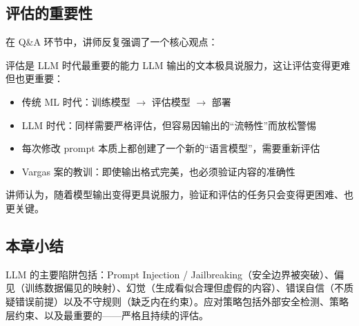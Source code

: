 \subsection{评估的重要性}

在 Q\&A 环节中，讲师反复强调了一个核心观点：

\begin{importantbox}{评估是 LLM 时代最重要的能力}
LLM 输出的文本极具说服力，这让评估变得更难但也更重要：
\begin{itemize}
    \item 传统 ML 时代：训练模型 $\rightarrow$ 评估模型 $\rightarrow$ 部署
    \item LLM 时代：同样需要严格评估，但容易因输出的``流畅性''而放松警惕
    \item 每次修改 prompt 本质上都创建了一个新的``语言模型''，需要重新评估
    \item Vargas 案的教训：即使输出格式完美，也必须验证内容的准确性
\end{itemize}
讲师认为，随着模型输出变得更具说服力，验证和评估的任务只会变得更困难、也更关键。
\end{importantbox}

\subsection{本章小结}

LLM 的主要陷阱包括：Prompt Injection / Jailbreaking（安全边界被突破）、偏见（训练数据偏见的映射）、幻觉（生成看似合理但虚假的内容）、错误自信（不质疑错误前提）以及不守规则（缺乏内在约束）。应对策略包括外部安全检测、策略层约束、以及最重要的——严格且持续的评估。

